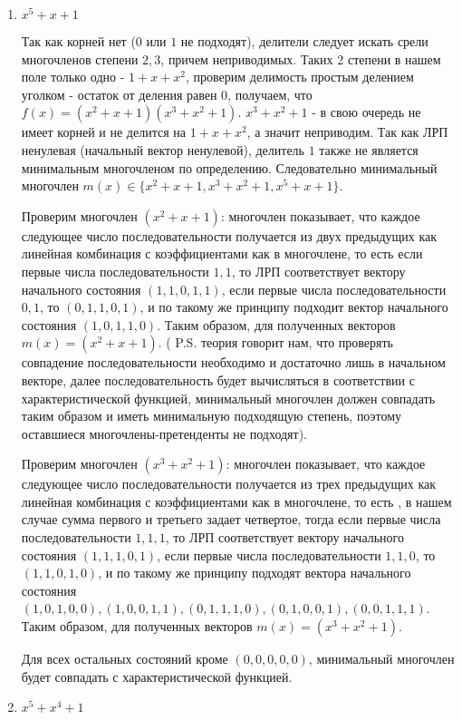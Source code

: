 \documentclass[12pt]{extarticle}
\begin{document}
\begin{enumerate}
    \item $x^5+x+1$
    
    Так как корней нет ($0$ или $1$ не подходят), делители следует искать срели многочленов степени $2,3$, причем неприводимых. Таких 2 степени в нашем поле только одно - $1 + x + x^2$, проверим делимость простым делением уголком - остаток от деления равен $0$, получаем, что $f(x) = (x^2+x+1)(x^3+x^2+1)$. $x^3+x^2+1$ - в свою очередь не имеет корней и не делится на $1 + x + x^2$, а значит неприводим. Так как ЛРП ненулевая (начальный вектор ненулевой), делитель $1$ также не является минимальным многочленом по определению. Следовательно минимальный многочлен $m(x)\in \{x^2+x+1, x^3+x^2+1, x^5+x+1\}$.
    
    Проверим многочлен $(x^2+x+1)$:  многочлен показывает, что каждое следующее число последовательности получается из двух предыдущих как линейная комбинация с коэффициентами как в многочлене, то есть если первые числа последовательности $1,1$, то ЛРП соответствует вектору начального состояния $(1, 1, 0, 1, 1)$, если первые числа последовательности $0,1$, то $(0, 1, 1, 0, 1)$, и по такому же принципу подходит вектор начального состояния $(1,0,1,1,0)$. Таким образом, для полученных векторов $m(x) = (x^2+x+1)$.  ( P.S. теория говорит нам, что проверять совпадение последовательности необходимо и достаточно лишь в начальном векторе, далее последовательность будет вычисляться в соответствии с характеристической функцией, минимальный многочлен должен совпадать таким образом и иметь минимальную подходящую степень, поэтому оставшиеся многочлены-претенденты не подходят).
    
    Проверим многочлен $(x^3+x^2+1)$:  многочлен показывает, что каждое следующее число последовательности получается из трех предыдущих как линейная комбинация с коэффициентами как в многочлене, то есть , в нашем случае сумма первого и третьего задает четвертое, тогда если первые числа последовательности $1,1,1$, то ЛРП соответствует вектору начального состояния $(1, 1, 1, 0, 1)$, если первые числа последовательности $1,1,0$, то $(1, 1, 0, 1, 0)$, и по такому же принципу подходят вектора начального состояния $(1,0,1,0,0), (1,0,0,1,1), (0,1,1,1,0), (0,1,0,0,1), (0,0,1,1,1)$. Таким образом, для полученных векторов $m(x) = (x^3+x^2+1)$.
    
    Для всех остальных состояний кроме $(0,0,0,0,0)$, минимальный многочлен будет совпадать с характеристической функцией.
    
    \item $x^5+x^4+1$
    

\end{enumerate}
\end{document}
